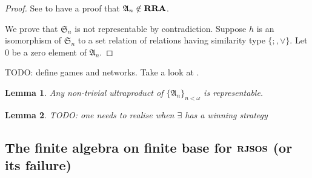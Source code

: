 \documentclass[a4paper]{article}
\theoremstyle{defin}
\theoremstyle{theorem}
\theoremstyle{prop}
\theoremstyle{lemma}
\newtheorem{lemma}{Lemma}
\theoremstyle{ex}
\theoremstyle{col}
\begin{document}
\begin{proof}
  See \cite{hodkinson2000axiomatizability} to have a proof that $\mathfrak{A}_n \notin {\bf RRA}$.

  We prove that $\mathfrak{S}_n$ is not representable by contradiction.
  Suppose $h$ is an isomorphism of $\mathfrak{S}_n$ to a set relation of relations having similarity type $\{ ;, \vee \}$. Let $0$ be a zero element of $\mathfrak{A}_n$.
\end{proof}

TODO: define games and networks. Take a look at \cite{hirsch1997step}.

\begin{lemma}
  Any non-trivial ultraproduct of $\{ \mathfrak{A}_n \}_{n < \omega}$ is representable.
\end{lemma}

\begin{lemma}
  TODO: one needs to realise when $\exists$ has a winning strategy
\end{lemma}

\subsection{The finite algebra on finite base for ${\bf RJSOS}$ (or its failure)}



\end{document}
